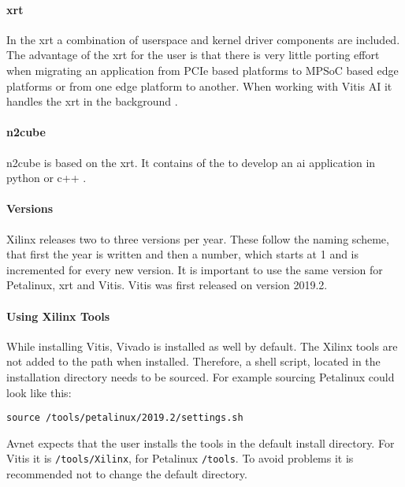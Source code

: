 \paragraph{\Acrfull{xrt}}
In the \acrfull{xrt} a combination of userspace and kernel driver components are included.
The advantage of the \acrshort{xrt} for the user is that there is very little porting effort when migrating an application from PCIe based platforms to MPSoC based edge platforms or from one edge platform to another.
When working with Vitis AI it handles the \acrshort{xrt} in the background \cite{xrt_overview}.

\paragraph{\Acrfull{n2cube}}
\acrshort{n2cube} is based on the \acrshort{xrt}.
It contains of the  to develop an \acrshort{ai} application in python or c++ \cite{vitis_ai_user_guide}.

\paragraph{Versions}
Xilinx releases two to three versions per year.
These follow the naming scheme, that first the year is written and then a number, which starts at 1 and is incremented for every new version.
It is important to use the same version for Petalinux, \acrshort{xrt} and Vitis.
Vitis was first released on version 2019.2.

\paragraph{Using Xilinx Tools}
While installing Vitis, Vivado is installed as well by default.
The Xilinx tools are not added to the path when installed.
Therefore, a shell script, located in the installation directory needs to be sourced.
For example sourcing Petalinux could look like this:
\begin{lstlisting}[style=bash, caption={}, label=lst:source_tools]
  source /tools/petalinux/2019.2/settings.sh
\end{lstlisting}
Avnet expects that the user installs the tools in the default install directory.
For Vitis it is \texttt{/tools/Xilinx}, for Petalinux \texttt{/tools}.
To avoid problems it is recommended not to change the default directory.

